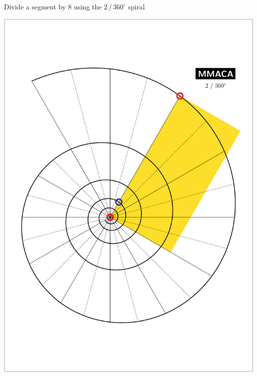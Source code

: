 \documentclass[a4paper,12pt]{article}
\begin{document}
    \begin{center}
    
        \large

        Divide a segment by 8 using the $2 \, / \, 360^{\circ}$ spiral

        \bigskip \bigskip \bigskip
    
        \includegraphics[scale=0.7071]{./pictures/Example_12}

    \end{center}

    \newpage

\end{document}
